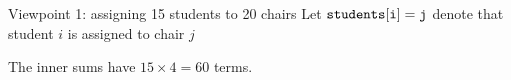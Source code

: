 \documentclass{cons-beamer}
\begin{document}
\begin{frame}[fragile]{Viewpoint 1: assigning 15 students to 20 chairs}
  Let $\mathtt{\mathtt{students}[i] = j}$ denote that student $i$ is assigned to chair $j$

  \pause
  \parBreak

  \lstset{aboveskip=0pt,belowskip=0pt}
  
  \pause
  
  \pause
  
  \normalsize
  \vfill

  \pause
  The inner sums have $15 \times 4=60$ terms.

\end{frame}
\end{document}
